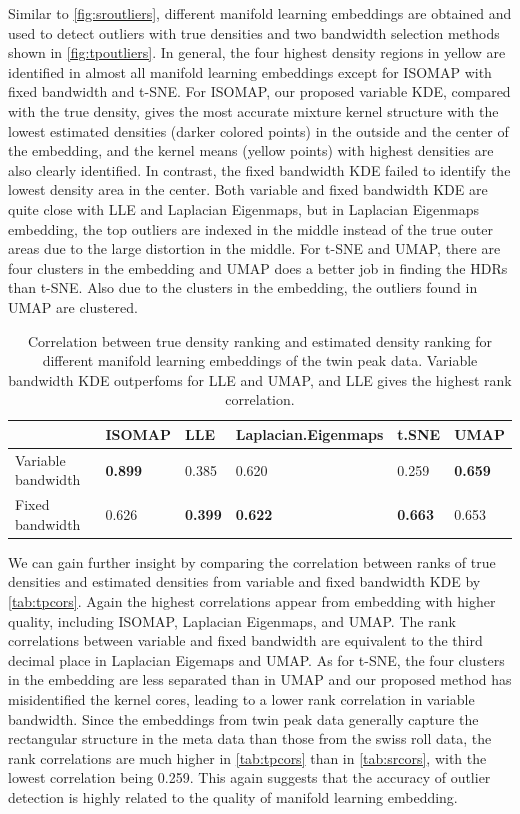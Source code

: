 \documentclass[11pt,a4paper,]{article}
\begin{document}
Similar to \autoref{fig:sroutliers}, different manifold learning embeddings are obtained and used to detect outliers with true densities and two bandwidth selection methods shown in \autoref{fig:tpoutliers}.
In general, the four highest density regions in yellow are identified in almost all manifold learning embeddings except for ISOMAP with fixed bandwidth and t-SNE. For ISOMAP, our proposed variable KDE, compared with the true density, gives the most accurate mixture kernel structure with the lowest estimated densities (darker colored points) in the outside and the center of the embedding, and the kernel means (yellow points) with highest densities are also clearly identified. In contrast, the fixed bandwidth KDE failed to identify the lowest density area in the center. Both variable and fixed bandwidth KDE are quite close with LLE and Laplacian Eigenmaps, but in Laplacian Eigenmaps embedding, the top outliers are indexed in the middle instead of the true outer areas due to the large distortion in the middle. For t-SNE and UMAP, there are four clusters in the embedding and UMAP does a better job in finding the HDRs than t-SNE. Also due to the clusters in the embedding, the outliers
found in UMAP are clustered.

\begin{table}

\caption{\label{tab:tpcors}Correlation between true density ranking and estimated density ranking for different manifold learning embeddings of the twin peak data. Variable bandwidth KDE outperfoms for LLE and UMAP, and LLE gives the highest rank correlation.}
\centering
\begin{tabular}[t]{l>{}l>{}l>{}l>{}l>{}l}
\toprule
  & ISOMAP & LLE & Laplacian.Eigenmaps & t.SNE & UMAP\\
\midrule
Variable bandwidth & \textbf{0.899} & 0.385 & 0.620 & 0.259 & \textbf{0.659}\\
Fixed bandwidth & 0.626 & \textbf{0.399} & \textbf{0.622} & \textbf{0.663} & 0.653\\
\bottomrule
\end{tabular}
\end{table}

We can gain further insight by comparing the correlation between ranks of true densities and estimated densities from variable and fixed bandwidth KDE by \autoref{tab:tpcors}. Again the highest correlations appear from embedding with higher quality, including ISOMAP, Laplacian Eigenmaps, and UMAP. The rank correlations between variable and fixed bandwidth are equivalent to the third decimal place in Laplacian Eigemaps and UMAP. As for t-SNE, the four clusters in the embedding are less separated than in UMAP and our proposed method has misidentified the kernel cores, leading to a lower rank correlation in variable bandwidth. Since the embeddings from twin peak data generally capture the rectangular structure in the meta data than those from the swiss roll data, the rank correlations are much higher in \autoref{tab:tpcors} than in \autoref{tab:srcors}, with the lowest correlation being 0.259. This again suggests that the accuracy of outlier detection is highly related to the quality of manifold learning embedding.
\end{document}
